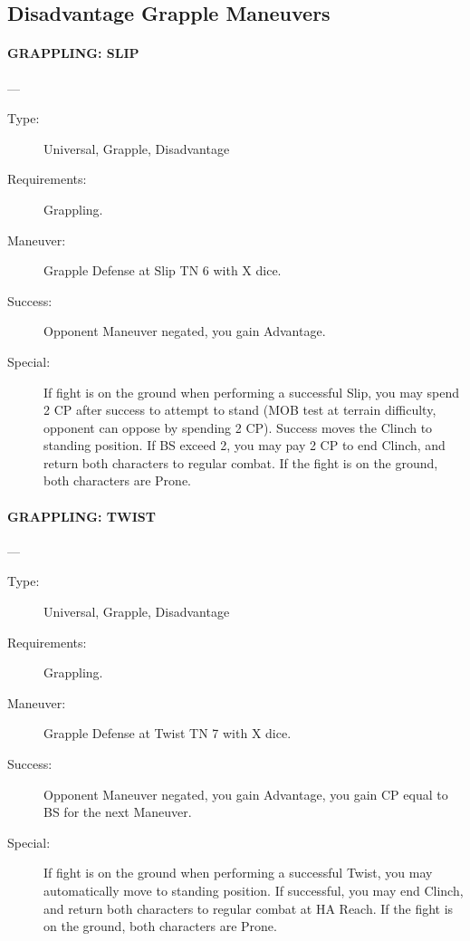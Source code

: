 \documentclass[oneside,11pt,english]{book}
\begin{document}
\subsection{Disadvantage Grapple Maneuvers}
\paragraph{\large\label{man:GRAPPLING: SLIP} GRAPPLING: SLIP}---\quad{\large[X]}
\vspace{-10pt}\begin{description} 
\item [Type:] Universal, Grapple, Disadvantage 
\item [Requirements:] Grappling. 
\item [Maneuver:] Grapple Defense at Slip TN 6 with X dice. 
\item [Success:] Opponent Maneuver negated, you gain Advantage. 
\item [Special:] If fight is on the ground when performing a successful Slip, you may spend 2 CP after success to 
attempt to stand (MOB test at terrain difficulty, opponent can oppose by spending 2 CP). Success moves 
the Clinch to standing position. 
If BS exceed 2, you may pay 2 CP to end Clinch, and return both characters to regular combat. If the fight 
is on the ground, both characters are Prone. 
\end{description}

\paragraph{\large\label{man:GRAPPLING: TWIST} GRAPPLING: TWIST}---\quad{\large[X]}
\vspace{-10pt}\begin{description} 
\item [Type:] Universal, Grapple, Disadvantage 
\item [Requirements:] Grappling. 
\item [Maneuver:] Grapple Defense at Twist TN 7 with X dice. 
\item [Success:] Opponent Maneuver negated, you gain Advantage, you gain CP equal to BS for the next 
Maneuver. 
\item [Special:] If fight is on the ground when performing a successful Twist, you may automatically move to 
standing position. 
If successful, you may end Clinch, and return both characters to regular combat at HA Reach. If the fight 
is on the ground, both characters are Prone. 
\end{description}
\end{document}
